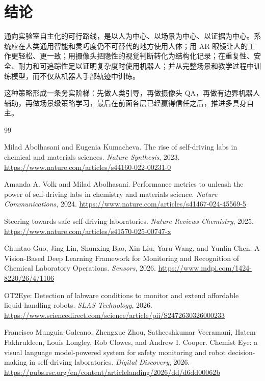 \documentclass[11pt,fontset=none]{ctexart}
\begin{document}
\section{结论}

通向实验室自主化的可行路线，是以人为中心、以场景为中心、以证据为中心。系统应在人类通用智能和灵巧度仍不可替代的地方使用人体；用 AR 眼镜让人的工作更轻松、更一致；用摄像头把隐性的视觉判断转化为结构化记录；在重复性、安全、耐力和可追踪性足以证明复杂度时使用机器人；并从完整场景和教学过程中训练模型，而不仅从机器人手部轨迹中训练。

这种策略形成一条务实阶梯：先做人类引导，再做摄像头 QA，再做有边界机器人辅助，再做场景级策略学习，最后在前面各层已经赢得信任之后，推进多具身自主。

\begin{thebibliography}{99}
\raggedright
\small

Milad Abolhasani and Eugenia Kumacheva.
The rise of self-driving labs in chemical and materials sciences.
\emph{Nature Synthesis}, 2023.
\url{https://www.nature.com/articles/s44160-022-00231-0}

Amanda A. Volk and Milad Abolhasani.
Performance metrics to unleash the power of self-driving labs in chemistry and materials science.
\emph{Nature Communications}, 2024.
\url{https://www.nature.com/articles/s41467-024-45569-5}

Steering towards safe self-driving laboratories.
\emph{Nature Reviews Chemistry}, 2025.
\url{https://www.nature.com/articles/s41570-025-00747-x}

Chuntao Guo, Jing Lin, Shunxing Bao, Xin Liu, Yaru Wang, and Yunlin Chen.
A Vision-Based Deep Learning Framework for Monitoring and Recognition of Chemical Laboratory Operations.
\emph{Sensors}, 2026.
\url{https://www.mdpi.com/1424-8220/26/4/1106}

OT2Eye: Detection of labware conditions to monitor and extend affordable liquid-handling robots.
\emph{SLAS Technology}, 2026.
\url{https://www.sciencedirect.com/science/article/pii/S2472630326000233}

Francisco Munguia-Galeano, Zhengxue Zhou, Satheeshkumar Veeramani, Hatem Fakhruldeen, Louis Longley, Rob Clowes, and Andrew I. Cooper.
Chemist Eye: a visual language model-powered system for safety monitoring and robot decision-making in self-driving laboratories.
\emph{Digital Discovery}, 2026.
\url{https://pubs.rsc.org/en/content/articlelanding/2026/dd/d6dd00062b}


\end{thebibliography}
\end{document}
